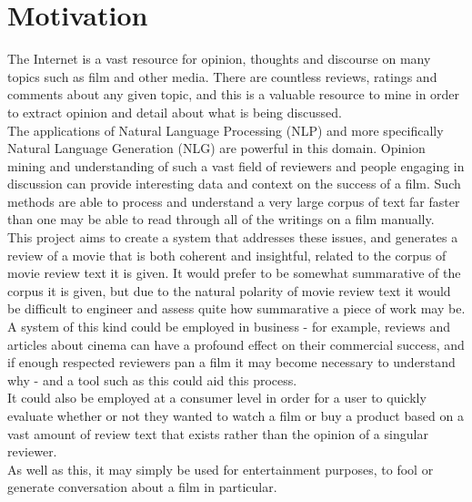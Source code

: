 \section{Motivation}

The Internet is a vast resource for opinion, thoughts and discourse on many topics such as film and other media. There are countless reviews, ratings and comments about any given topic, and this is a valuable resource to mine in order to extract opinion and detail about what is being discussed.\\

The applications of Natural Language Processing (NLP) and more specifically Natural Language Generation (NLG) are powerful in this domain.  Opinion mining and understanding of such a vast field of reviewers and people engaging in discussion can provide interesting data and context on the success of a film. Such methods are able to process and understand a very large corpus of text far faster than one may be able to read through all of the writings on a film manually. \\

This project aims to create a system that addresses these issues, and generates a review of a movie that is both coherent and insightful, related to the corpus of movie review text it is given. It would prefer to be somewhat summarative of the corpus it is given, but due to the natural polarity of movie review text it would be difficult to engineer and assess quite how summarative a piece of work may be.\\

A system of this kind could be employed in business - for example, reviews and articles about cinema can have a profound effect on their commercial success, and if enough respected reviewers pan a film it may become necessary to understand why - and a tool such as this could aid this process.\\

It could also be employed at a consumer level in order for a user to quickly evaluate whether or not they wanted to watch a film or buy a product based on a vast amount of review text that exists rather than the opinion of a singular reviewer.\\
As well as this, it may simply be used for entertainment purposes, to fool or generate conversation about a film in particular.\\


